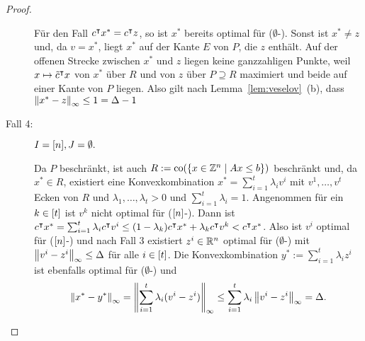 \begin{proof}
\begin{description}
		Für den Fall $c^\intercal x^*=c^\intercal z$, so ist $x^*$ bereits optimal für ($\emptyset$-\MIPI).
		Sonst ist $x^* \neq z$ und, da $v=x^*$, liegt $x^*$ auf der Kante $E$ von $P$, die $z$ enthält.
		Auf der offenen Strecke zwischen $x^*$ und $z$ liegen keine ganzzahligen Punkte, weil $x\mapsto \tilde{c}^\intercal x$ von $x^*$ über $R$ und von $z$ über $P\supseteq R$ maximiert und beide auf einer Kante von $P$ liegen.
		Also gilt nach Lemma~\ref{lem:veselov}~(b), dass $\left\lVert x^*-z\right\rVert_\infty\leq 1 = \Delta -1 $
		
		\item[Fall 4:] $I=[n],J=\emptyset.$
		
		Da $P$ beschränkt, ist auch $R:=\operatorname{co}(\{x\in\mathbb{Z}^n \mid Ax\leq b\})$ beschränkt und, da $x^*\in R$, existiert eine Konvexkombination $x^* = \sum_{i=1}^t \lambda_i v^i$ mit $v^1,\dots,v^t$ Ecken von $R$ und $\lambda_1,\dots,\lambda_t>0$ und $\sum_{i=1}^t \lambda_i=1$.
		Angenommen für ein $k\in[t]$ ist $v^k$ nicht optimal für ($[n]$-\MIPI).
		Dann ist $c^\intercal x^*=\sum_{i=1}^t \lambda_i c^\intercal v^i \leq (1-\lambda_k)c^\intercal x^* + \lambda_k c^\intercal v^k < c^\intercal x^*$.
		Also ist $v^i$ optimal für ($[n]$-\MIPI) und nach Fall 3 existiert $z^i\in\mathbb{R}^n$ optimal für ($\emptyset$-\MIPI) mit $\left\lVert v^i-z^i\right\rVert_\infty\leq \Delta$ für alle $i\in[t]$.
		Die Konvexkombination $y^*:=\sum_{i=1}^t \lambda_i z^i$ ist ebenfalls optimal für ($\emptyset$-\MIPI) und
		$$\left\lVert x^*-y^*\right\rVert_\infty=\left\lVert\sum_{i=1}^t \lambda_i (v^i-z^i)\right\rVert_\infty\leq \sum_{i=1}^t \lambda_i \left\lVert v^i-z^i\right\rVert_\infty=\Delta.$$
	\end{description}
\end{proof}